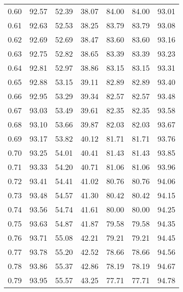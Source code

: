\begin{tabular}{|c|c|c|c|c|c|c|}
      0.60 &     92.57 &     52.39 &      38.07 &   84.00 &      84.00 &         93.01 \\
      0.61 &     92.63 &     52.53 &      38.25 &   83.79 &      83.79 &         93.08 \\
      0.62 &     92.69 &     52.69 &      38.47 &   83.60 &      83.60 &         93.16 \\
      0.63 &     92.75 &     52.82 &      38.65 &   83.39 &      83.39 &         93.23 \\
      0.64 &     92.81 &     52.97 &      38.86 &   83.15 &      83.15 &         93.31 \\
      0.65 &     92.88 &     53.15 &      39.11 &   82.89 &      82.89 &         93.40 \\
      0.66 &     92.95 &     53.29 &      39.34 &   82.57 &      82.57 &         93.48 \\
      0.67 &     93.03 &     53.49 &      39.61 &   82.35 &      82.35 &         93.58 \\
      0.68 &     93.10 &     53.66 &      39.87 &   82.03 &      82.03 &         93.67 \\
      0.69 &     93.17 &     53.82 &      40.12 &   81.71 &      81.71 &         93.76 \\
      0.70 &     93.25 &     54.01 &      40.41 &   81.43 &      81.43 &         93.85 \\
      0.71 &     93.33 &     54.20 &      40.71 &   81.06 &      81.06 &         93.96 \\
      0.72 &     93.41 &     54.41 &      41.02 &   80.76 &      80.76 &         94.06 \\
      0.73 &     93.48 &     54.57 &      41.30 &   80.42 &      80.42 &         94.15 \\
      0.74 &     93.56 &     54.74 &      41.61 &   80.00 &      80.00 &         94.25 \\
      0.75 &     93.63 &     54.87 &      41.87 &   79.58 &      79.58 &         94.35 \\
      0.76 &     93.71 &     55.08 &      42.21 &   79.21 &      79.21 &         94.45 \\
      0.77 &     93.78 &     55.20 &      42.52 &   78.66 &      78.66 &         94.56 \\
      0.78 &     93.86 &     55.37 &      42.86 &   78.19 &      78.19 &         94.67 \\
      0.79 &     93.95 &     55.57 &      43.25 &   77.71 &      77.71 &         94.78 \\

\end{tabular}
